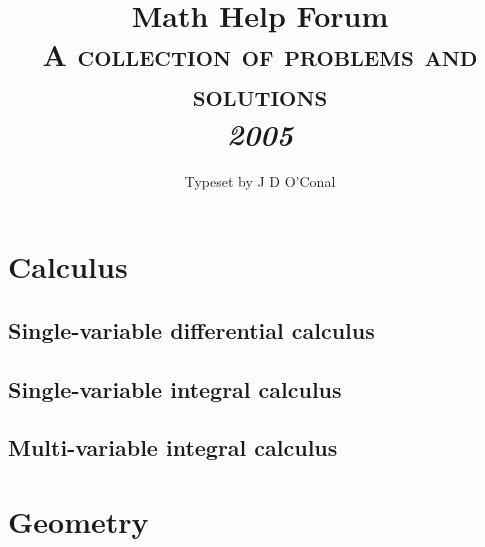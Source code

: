 \documentclass[a4paper]{book}
\makeatletter
\renewcommand\tableofcontents{%
    \if@twocolumn
      \@restonecoltrue\onecolumn
    \else
      \@restonecolfalse
    \fi
    \chapter*{\contentsname}%
        \@mkboth{%
           \MakeUppercase\contentsname}{\MakeUppercase\contentsname}%
    \@starttoc{toc}%
    \if@restonecol\twocolumn\fi
    }
\makeatother
\begin{document}
    \title{Math Help Forum\\\vspace{12pt}\Large\textsc{A collection of problems and solutions}\\\vspace{12pt}\Huge\textit{2005}}
    \author{Typeset by J D O'Conal}
    \date{}

    \maketitle

    \tableofcontents

	\chapter{Calculus}

	\section{Single-variable differential calculus}

    
    

	\section{Single-variable integral calculus}

    
    

	\section{Multi-variable integral calculus}

    

    \chapter{Geometry}
    
	
\end{document}
